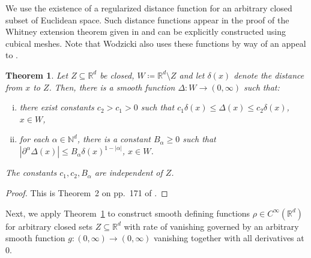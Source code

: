 \documentclass[12pt]{article}
\theoremstyle{plain}
\newtheorem{thm}{Theorem}[section]
\theoremstyle{definition}
\newcommand{\R}{\mathbb{R}}
\newcommand{\N}{\mathbb{N}}
\numberwithin{equation}{section}
\begin{document}
 

We use  the existence of a regularized distance function for an arbitrary  closed subset of Euclidean space. Such distance functions appear in the proof of the Whitney extension theorem given in \cite{Stein[1970]} and can be explicitly constructed using cubical meshes. Note that Wodzicki \cite{Wodzicki} also uses these functions by way of an  appeal to \cite{Voigt}.


\begin{thm}\label{regdist}
Let $Z \subseteq \R^d$ be closed,  $W \coloneqq \R^d \setminus Z$ and let  $\delta(x)$ denote the distance from $x$ to $Z$. Then, there is a smooth function $\Delta : W \to (0,\infty)$ such that: 
\begin{enumerate}[(i)]
\item there exist constants $c_2>c_1>0$ such that $c_1 \delta(x)  \leq \Delta(x)  \leq c_2 \delta(x)$, $x \in W$, 
\item for each $\alpha \in \N^d$, there is  a constant $B_\alpha \geq 0$ such that $| \partial^\alpha \Delta(x) | \leq B_\alpha \delta(x)^{1-|\alpha|}$, $x \in W$. 
\end{enumerate}
The constants $c_1,c_2, B_\alpha$ are independent of $Z$. 
\end{thm}
\begin{proof}
This is Theorem~2 on pp.~171 of \cite{Stein[1970]}.
\end{proof}

 
Next, we apply Theorem~\ref{regdist} to construct smooth defining functions $\rho \in C^\infty(\R^d)$ for arbitrary closed sets $Z \subseteq \R^d$ with rate of vanishing  governed  by an arbitrary smooth function $g : (0,\infty) \to (0,\infty)$ vanishing together with all  derivatives at $0$.
\end{document}
